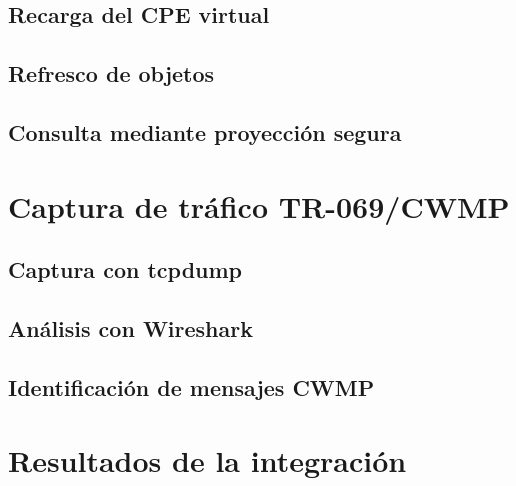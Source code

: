\subsection{Recarga del CPE virtual}
\label{subsec:recarga-cpe-virtual}

\subsection{Refresco de objetos}
\label{subsec:refresco-objetos}

\subsection{Consulta mediante proyección segura}
\label{subsec:consulta-proyeccion-segura}


\section{Captura de tráfico TR-069/CWMP}
\label{sec:captura-trafico-tr069-cwmp}

\subsection{Captura con tcpdump}
\label{subsec:captura-tcpdump}

\subsection{Análisis con Wireshark}
\label{subsec:analisis-wireshark}

\subsection{Identificación de mensajes CWMP}
\label{subsec:identificacion-mensajes-cwmp}


\section{Resultados de la integración}
\label{sec:resultados-integracion}